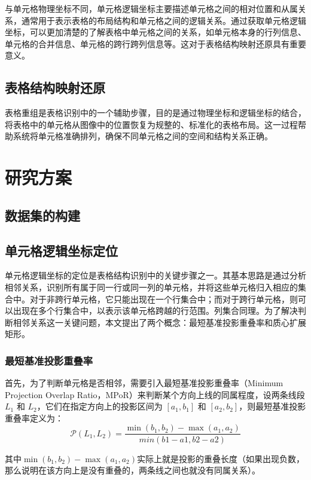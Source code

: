 \documentclass[UTF8,12pt, AutoFakeBold,fontset = founder]{ctexart}
\begin{document}
与单元格物理坐标不同，单元格逻辑坐标主要描述单元格之间的相对位置和从属关系，通常用于表示表格的布局结构和单元格之间的逻辑关系。通过获取单元格逻辑坐标，可以更加清楚的了解表格中单元格之间的关系，如单元格本身的行列信息、单元格的合并信息、单元格的跨行跨列信息等。这对于表格结构映射还原具有重要意义。

\subsection{表格结构映射还原}

表格重组是表格识别中的一个辅助步骤，目的是通过物理坐标和逻辑坐标的结合，将表格中的单元格从图像中的位置恢复为规整的、标准化的表格布局。这一过程帮助系统将单元格准确排列，确保不同单元格之间的空间和结构关系正确。

\section{研究方案}
\subsection{数据集的构建}
\subsection{单元格逻辑坐标定位}

单元格逻辑坐标的定位是表格结构识别中的关键步骤之一。其基本思路是通过分析相邻关系，识别所有属于同一行或同一列的单元格，并将这些单元格归入相应的集合中。对于非跨行单元格，它只能出现在一个行集合中；而对于跨行单元格，则可以出现在多个行集合中，以表示该单元格跨越的行范围。列集合同理。为了解决判断相邻关系这一关键问题，本文提出了两个概念：最短基准投影重叠率和质心扩展矩形。

\subsubsection{最短基准投影重叠率}
首先，为了判断单元格是否相邻，需要引入最短基准投影重叠率（Minimum Projection Overlap Ratio，MPoR）来判断某个方向上线的同属程度，设两条线段 \( L_1 \) 和 \( L_2 \)，它们在指定方向上的投影区间为 \([a_1, b_1]\) 和 \([a_2, b_2]\)，则最短基准投影重叠率定义为：
\begin{equation}
    \mathcal{P}(L_1,L_2) = \frac{\min(b_1, b_2) - \max(a_1, a_2)}{min(b1-a1, b2-a2)}
\label{eq:piol}
\end{equation}


其中$\min(b_1, b_2) - \max(a_1, a_2)$实际上就是投影的重叠长度（如果出现负数，那么说明在该方向上是没有重叠的，两条线之间也就没有同属关系）。
\end{document}
